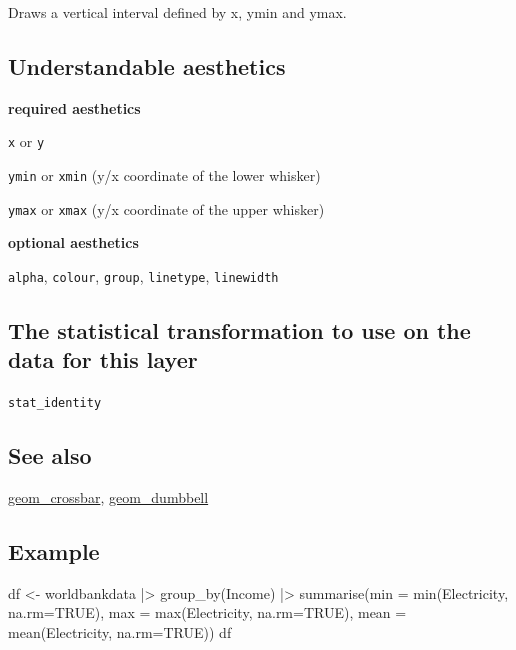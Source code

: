 \documentclass[
  letterpaper,
  DIV=11,
  numbers=noendperiod]{scrreprt}
\newenvironment{Shaded}{\begin{snugshade}}{\end{snugshade}}
\newcommand{\AttributeTok}[1]{\textcolor[rgb]{0.40,0.45,0.13}{#1}}
\newcommand{\ConstantTok}[1]{\textcolor[rgb]{0.56,0.35,0.01}{#1}}
\newcommand{\FunctionTok}[1]{\textcolor[rgb]{0.28,0.35,0.67}{#1}}
\newcommand{\NormalTok}[1]{\textcolor[rgb]{0.00,0.23,0.31}{#1}}
\newcommand{\OtherTok}[1]{\textcolor[rgb]{0.00,0.23,0.31}{#1}}
\newcommand{\SpecialCharTok}[1]{\textcolor[rgb]{0.37,0.37,0.37}{#1}}
\begin{document}
Draws a vertical interval defined by x, ymin and ymax.

\subsection{Understandable
aesthetics}\label{understandable-aesthetics-1}

\textbf{required aesthetics}

\texttt{x} or \texttt{y}

\texttt{ymin} or \texttt{xmin} (y/x coordinate of the lower whisker)

\texttt{ymax} or \texttt{xmax} (y/x coordinate of the upper whisker)

\textbf{optional aesthetics}

\texttt{alpha}, \texttt{colour}, \texttt{group}, \texttt{linetype},
\texttt{linewidth}

\subsection{The statistical transformation to use on the data for this
layer}\label{the-statistical-transformation-to-use-on-the-data-for-this-layer}

\texttt{stat\_identity}

\subsection{See also}\label{see-also}

\hyperref[crossbar]{geom\_crossbar}, \hyperref[dumbbell]{geom\_dumbbell}

\subsection{Example}\label{example-1}

\begin{Shaded}
\begin{Highlighting}[]
\NormalTok{df }\OtherTok{\textless{}{-}}\NormalTok{ worldbankdata }\SpecialCharTok{|\textgreater{}}
  \FunctionTok{group\_by}\NormalTok{(Income) }\SpecialCharTok{|\textgreater{}}
  \FunctionTok{summarise}\NormalTok{(}\AttributeTok{min =} \FunctionTok{min}\NormalTok{(Electricity, }\AttributeTok{na.rm=}\ConstantTok{TRUE}\NormalTok{), }\AttributeTok{max =} \FunctionTok{max}\NormalTok{(Electricity, }\AttributeTok{na.rm=}\ConstantTok{TRUE}\NormalTok{), }\AttributeTok{mean =} \FunctionTok{mean}\NormalTok{(Electricity, }\AttributeTok{na.rm=}\ConstantTok{TRUE}\NormalTok{))}
\NormalTok{df}
\end{Highlighting}
\end{Shaded}
\end{document}
